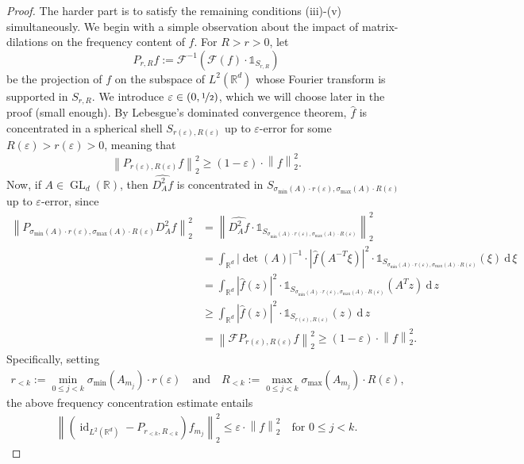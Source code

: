 \documentclass[10pt,a4paper]{amsart}
\DeclareMathOperator{\GL}{GL}
\newcommand{\R}{{\mathbb{R}}}
\newcommand{\dxi}{\:\mathrm{d}\,\xi\:}
\newcommand{\dz}{\:\mathrm{d}\,z\:}
\DeclareMathOperator{\id}{id}
\newcommand{\norm}[1]{\ensuremath{\left\lVert\text{}#1\text{}\right\rVert}}
\begin{document}
\begin{proof}
    The harder part is to satisfy the remaining conditions (iii)-(v) simultaneously. 
    We begin with a simple observation about the impact of matrix-dilations on the frequency content of $f$.
    For $R>r>0$, let 
    \[P_{r,R}f:=\mathcal{F}^{-1}(\mathcal{F}(f)\cdot \mathds{1}_{S_{r,R}})\] 
    be the projection of $f$ on the subspace of $L^2(\R^d)$ whose Fourier transform is supported in $S_{r,R}$. We introduce $\varepsilon \in (0,\nicefrac{1}{2})$, which we will choose later in the proof (small enough). By Lebesgue's dominated convergence theorem, $\widehat{f}$ is concentrated in a spherical shell $S_{r(\varepsilon),R(\varepsilon)}$ up to $\varepsilon$-error for some $R(\varepsilon)>r(\varepsilon)>0$, meaning that
    \[\norm{P_{r(\varepsilon),R(\varepsilon)}f}_2^2
    \geq (1-\varepsilon) \cdot \norm{f}_2^2.\] 
    Now, if $A \in \GL_d(\R)$, then $\widehat{D_A^2f}$ is concentrated in $S_{\sigma_{\text{min}}(A)\cdot r(\varepsilon),\sigma_{\text{max}}(A) \cdot R(\varepsilon)}$ up to $\varepsilon$-error, since
    \begin{align*}
      \norm{P_{\sigma_{\text{min}}(A)\cdot r(\varepsilon),\sigma_{\text{max}}(A) \cdot R(\varepsilon)}D_A^2f}_2^2 
      &= \norm{\widehat{D_A^2f}\cdot \mathds{1}_{S_{\sigma_\text{min}(A)\cdot r(\varepsilon),\sigma_{\text{max}}(A)\cdot R(\varepsilon)}}}_2^2 \\
      &=\int_{\R^d}|\det(A)|^{-1} \cdot |\widehat{f}(A^{-T}\xi)|^2 \cdot \mathds{1}_{S_{\sigma_\text{min}(A)\cdot r(\varepsilon),\sigma_{\text{max}}(A)\cdot R(\varepsilon)}}(\xi) \dxi \\
      &=\int_{\R^d}|\widehat{f}(z)|^2 \cdot \mathds{1}_{S_{\sigma_\text{min}(A)\cdot r(\varepsilon),\sigma_{\text{max}}(A)\cdot R(\varepsilon)}}(A^Tz) \dz \\
      &\geq\int_{\R^d}|\widehat{f}(z)|^2 \cdot \mathds{1}_{S_{r(\varepsilon),R(\varepsilon)}}(z) \dz \\
      &=\norm{\mathcal{F}P_{r(\varepsilon),R(\varepsilon)}f}_2^2 \geq (1-\varepsilon) \cdot \norm{f}_2^2.
    \end{align*}
    Specifically, setting 
    \begin{align*}
      r_{<k}:=\min_{0\leq j<k} \sigma_{\text{min}}(A_{m_j}) \cdot r(\varepsilon) \quad \text{and} \quad R_{<k}:=\max_{0\leq j<k} \sigma_{\text{max}}(A_{m_j}) \cdot R(\varepsilon),
    \end{align*}
    the above frequency concentration estimate entails
    \begin{align*}
      \norm{(\id_{L^2(\R^d)}-P_{r_{<k},R_{<k}})f_{m_j}}_2^2 \leq \varepsilon \cdot \norm{f}_2^2 \quad \text{for } 0\leq j <k.

\end{align*}
\end{proof}
\end{document}
